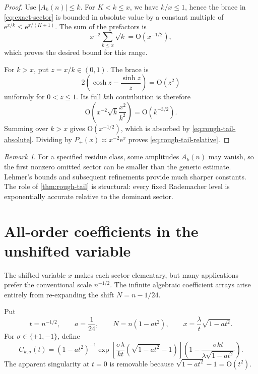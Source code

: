 \documentclass[11pt,a4paper]{article}
\numberwithin{equation}{section}
\theoremstyle{remark}
\newtheorem{remark}[theorem]{Remark}
\newcommand{\e}{\mathrm e}
\newcommand{\bigO}{\mathrm O}
\begin{document}
\begin{proof}
Use $|A_k(n)|\le k$.  For $K<k\le x$, we have $k/x\le1$, hence the brace in \cref{eq:exact-sector} is bounded in absolute value by a constant multiple of $\e^{x/k}\le\e^{x/(K+1)}$.  The sum of the prefactors is
\[
 x^{-2}\sum_{k\le x}\sqrt{k}=\bigO(x^{-1/2}),
\]
which proves the desired bound for this range.

For $k>x$, put $z=x/k\in(0,1)$.  The brace is
\[
 2\left(\cosh z-\frac{\sinh z}{z}\right)=\bigO(z^2)
\]
uniformly for $0<z\le1$.  Its full $k$th contribution is therefore
\[
 \bigO\!\left(x^{-2}\sqrt{k}\frac{x^2}{k^2}\right)
 =\bigO(k^{-3/2}).
\]
Summing over $k>x$ gives $\bigO(x^{-1/2})$, which is absorbed by \cref{eq:rough-tail-absolute}.  Dividing by $P_+(x)\asymp x^{-2}\e^x$ proves \cref{eq:rough-tail-relative}.
\end{proof}

\begin{remark}
For a specified residue class, some amplitudes $A_k(n)$ may vanish, so the first nonzero omitted sector can be smaller than the generic estimate.  Lehmer's bounds and subsequent refinements provide much sharper constants.  The role of \cref{thm:rough-tail} is structural: every fixed Rademacher level is exponentially accurate relative to the dominant sector.
\end{remark}

\section{All-order coefficients in the unshifted variable}\label{sec:forward-coefficients}

The shifted variable $x$ makes each sector elementary, but many applications prefer the conventional scale $n^{-1/2}$.  The infinite algebraic coefficient arrays arise entirely from re-expanding the shift $N=n-1/24$.

Put
\begin{equation}\label{eq:t-def}
 t=n^{-1/2},\qquad a=\frac1{24},\qquad
 N=n(1-at^2),\qquad
 x=\frac{\lambda}{t}\sqrt{1-at^2}.
\end{equation}
For $\sigma\in\{+1,-1\}$, define
\begin{equation}\label{eq:Cksigma}
 C_{k,\sigma}(t)=
 (1-at^2)^{-1}
 \exp\!\left[
 \frac{\sigma\lambda}{kt}
 \left(\sqrt{1-at^2}-1\right)
 \right]
 \left(1-\frac{\sigma kt}{\lambda\sqrt{1-at^2}}\right).
\end{equation}
The apparent singularity at $t=0$ is removable because
$\sqrt{1-at^2}-1=\bigO(t^2)$.
\end{document}

